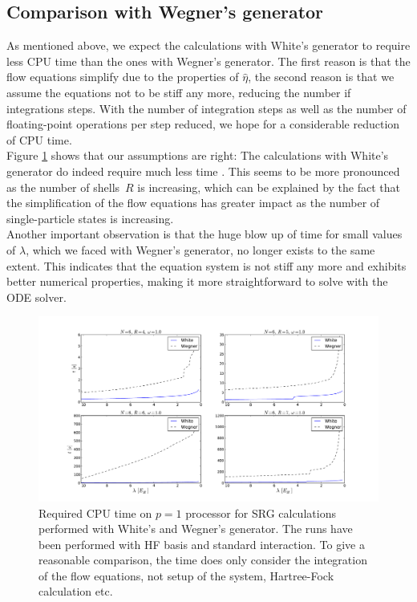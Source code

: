 \subsection{Comparison with Wegner's generator}
\label{subsec:CompWegner}
As mentioned above, we expect the calculations with White's generator to require less CPU time than the ones with Wegner's generator. The first reason is that the flow equations simplify due to the properties of $\hat{\eta}$, the second reason is that we assume the equations not to be stiff any more, reducing the number if integrations steps. With the number of integration steps as well as the number of floating-point operations per step reduced, we hope for a considerable reduction of CPU time. \\
Figure \ref{fig:timeWhiteWegner} shows that our assumptions are right: The calculations with White's generator do indeed require much less time . This seems to be more pronounced as the number of \mbox{shells $R$} is increasing, which can be explained by the fact that the simplification of the flow equations has greater impact as the number of single-particle states is increasing.\\
Another important observation is that the huge blow up of time for small values of $\lambda$, which we faced with Wegner's generator, no longer exists to the same extent.
This indicates that the equation system is not stiff any more and exhibits better numerical properties, making it more straightforward to solve with the ODE solver.
 
\begin{figure}
\begin{center}
\includegraphics[scale=0.42]{../Plots/timeWhiteWegner.pdf}
\caption{Required CPU time on $p=1$ processor for SRG calculations performed with White's and Wegner's generator. The runs have been performed with HF basis and standard interaction. To give a reasonable comparison, the time does only consider the integration of the flow equations, not setup of the system, Hartree-Fock calculation etc.}
\label{fig:timeWhiteWegner}
\end{center}
\end{figure}

